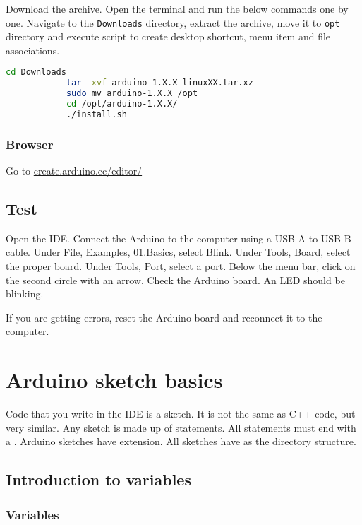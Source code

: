 \documentclass{article}
\begin{document}
			Download the  archive. Open the terminal and run the below commands one by one\@. Navigate to the \texttt{Downloads} directory, extract the archive, move it to \texttt{opt} directory and execute script to create desktop shortcut, menu item and file associations.

			\begin{lstlisting}[language=bash]
			cd Downloads
			tar -xvf arduino-1.X.X-linuxXX.tar.xz
			sudo mv arduino-1.X.X /opt
			cd /opt/arduino-1.X.X/
			./install.sh
			\end{lstlisting}

		\subsubsection{Browser}
			Go to \url{create.arduino.cc/editor/}

	\subsection{Test}

		Open the IDE\@. Connect the Arduino to the computer using a USB A to USB B cable. Under File, Examples, 01.Basics, select Blink. Under Tools, Board, select the proper board. Under Tools, Port, select a port. Below the menu bar, click on the second circle with an arrow. Check the Arduino board. An LED should be blinking.

		If you are getting errors, reset the Arduino board and reconnect it to the computer.

\section{Arduino sketch basics}

	Code that you write in the IDE is a sketch. It is not the same as C++ code, but very similar. Any sketch is made up of statements. All statements must end with a \inlncd{;}. Arduino sketches have  extension. All sketches have  as the directory structure.

	\subsection{Introduction to variables}
	
		\subsubsection{Variables}
\end{document}
